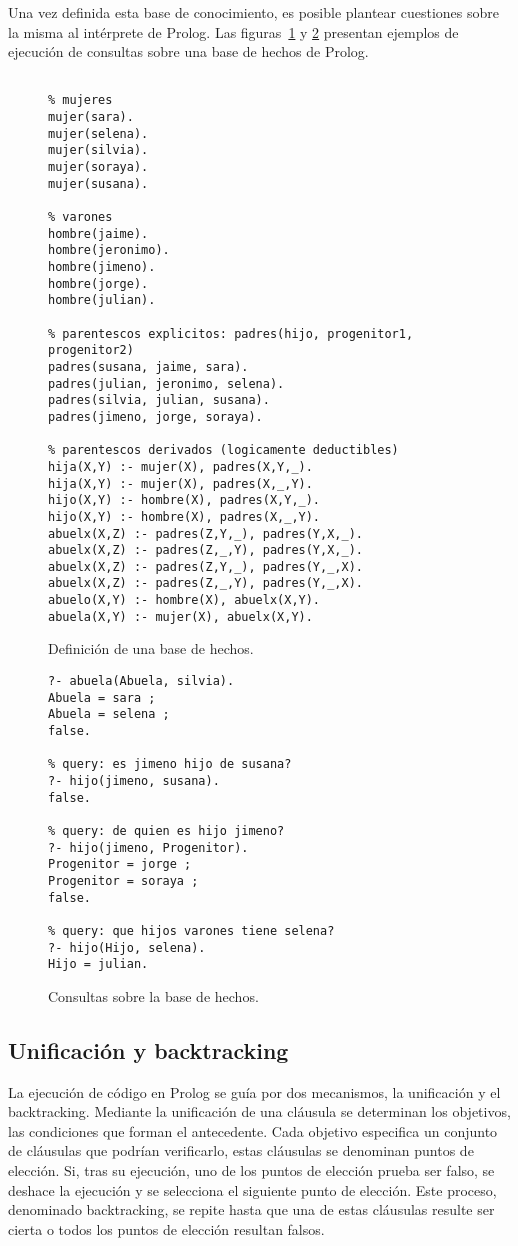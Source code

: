 \documentclass[11pt,captions=nooneline,DIV=14, parskip=full]{scrartcl}
\begin{document}
Una vez definida esta base de conocimiento, es posible plantear cuestiones sobre la misma al intérprete de Prolog. Las figuras~\ref{fig:basehechos} y \ref{fig:queries} presentan ejemplos de ejecución de consultas sobre una base de hechos de Prolog.

\begin{figure}[p]
\lstset{language=Prolog}
\begin{lstlisting}[frame=single]
% base de hechos

% mujeres
mujer(sara).
mujer(selena).
mujer(silvia).
mujer(soraya).
mujer(susana).

% varones
hombre(jaime).
hombre(jeronimo).
hombre(jimeno).
hombre(jorge).
hombre(julian).

% parentescos explicitos: padres(hijo, progenitor1, progenitor2)
padres(susana, jaime, sara).
padres(julian, jeronimo, selena).
padres(silvia, julian, susana).
padres(jimeno, jorge, soraya).

% parentescos derivados (logicamente deductibles)
hija(X,Y) :- mujer(X), padres(X,Y,_).
hija(X,Y) :- mujer(X), padres(X,_,Y).
hijo(X,Y) :- hombre(X), padres(X,Y,_).
hijo(X,Y) :- hombre(X), padres(X,_,Y).
abuelx(X,Z) :- padres(Z,Y,_), padres(Y,X,_).
abuelx(X,Z) :- padres(Z,_,Y), padres(Y,X,_).
abuelx(X,Z) :- padres(Z,Y,_), padres(Y,_,X).
abuelx(X,Z) :- padres(Z,_,Y), padres(Y,_,X).
abuelo(X,Y) :- hombre(X), abuelx(X,Y).
abuela(X,Y) :- mujer(X), abuelx(X,Y).
\end{lstlisting} 
\caption{Definición de una base de hechos.}
\label{fig:basehechos}
\end{figure}

\begin{figure}[h]
\lstset{language=Prolog}
\begin{lstlisting}[frame=single]
% query: quien es abuela de silvia?
?- abuela(Abuela, silvia).
Abuela = sara ;
Abuela = selena ;
false.

% query: es jimeno hijo de susana?
?- hijo(jimeno, susana).
false.

% query: de quien es hijo jimeno?
?- hijo(jimeno, Progenitor).
Progenitor = jorge ;
Progenitor = soraya ;
false.

% query: que hijos varones tiene selena?
?- hijo(Hijo, selena).
Hijo = julian.
\end{lstlisting} 
\caption{Consultas sobre la base de hechos.}
\label{fig:queries}
\end{figure}

\subsection{Unificación y backtracking}
La ejecución de código en Prolog se guía por dos mecanismos, la unificación y el backtracking. Mediante la unificación de una cláusula se determinan los objetivos, las condiciones que forman el antecedente. Cada objetivo especifica un conjunto de cláusulas que podrían verificarlo, estas cláusulas se denominan puntos de elección. Si, tras su ejecución, uno de los puntos de elección prueba ser falso, se deshace la ejecución y se selecciona el siguiente punto de elección. Este proceso, denominado backtracking, se repite hasta que una de estas cláusulas resulte ser cierta o todos los puntos de elección resultan falsos.
\end{document}
